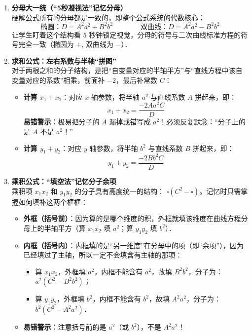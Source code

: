 \documentclass[11pt,a4paper]{ctexart}
\begin{document}
\begin{enumerate}[label=\arabic*.]
  \item \textbf{分母大一统（“5秒凝视法”记忆分母）} \\
        硬解公式所有的分母都是一致的，即整个公式系统的代数核心：
        \[ \text{椭圆}：D = A^2a^2 + B^2b^2 \qquad\qquad \text{双曲线}：D = A^2a^2 - B^2b^2 \]
        让学生盯着这个结构看 $5$ 秒钟锁定视觉，分母的符号与二次曲线标准方程的符号完全一致（椭圆为 $+$, 双曲线为 $-$）．
        
  \item \textbf{求和公式：左右系数与半轴“拼图”} \\
        对于两根之和的分子结构，是把“自变量对应的半轴平方”与“直线方程中该自变量对应的系数”相乘，前面补 $-2$，最后补常数 $C$：
        \begin{itemize}
          \item \textbf{计算 $x_1+x_2$}：对应 $x$ 轴参数，将半轴 $a^2$ 与直线系数 $A$ 拼起来，即：
                \[ x_1 + x_2 = \frac{-2Aa^2C}{D} \]
                \textbf{易错警示}：极易把分子的 $A$ 漏掉或错写成 $a^2$！必须反复默念：“分子上的是 $A$ 不是 $a^2$！”
          \item \textbf{计算 $y_1+y_2$}：对应 $y$ 轴参数，将半轴 $b^2$ 与直线系数 $B$ 拼起来，即：
                \[ y_1 + y_2 = \frac{-2Bb^2C}{D} \]
        \end{itemize}

  \item \textbf{乘积公式：“填空法”记忆分子余项} \\
        乘积项 $x_1x_2$ 和 $y_1y_2$ 的分子具有高度统一的结构： $\square(C^2 - \square)$。记忆时只需掌握如何填补这两个框框：
        \begin{itemize}
          \item \textbf{外框（括号前）}：因为算的是哪个维度的积，外框就填该维度在曲线方程分母上的半轴平方（算 $x_1x_2$ 填 $a^2$；算 $y_1y_2$ 填 $b^2$）．
          \item \textbf{内框（括号内）}：内框填的是“另一维度”在分母中的项（即“余项”），因为已经填过了主轴，所以一定不会填含有主轴的那项：
                \begin{itemize}
                  \item 算 $x_1x_2$，外框填 $a^2$，内框不能含有 $a^2$，故填 $B^2b^2$，分子为：$a^2(C^2 - B^2b^2)$；
                  \item 算 $y_1y_2$，外框填 $b^2$，内框不能含有 $b^2$，故填 $A^2a^2$，分子为：$b^2(C^2 - A^2a^2)$．
                \end{itemize}
          \item \textbf{易错警示}：注意括号前的是 $a^2$（或 $b^2$），不是 $A^2a^2$！
        \end{itemize}


\end{enumerate}
\end{document}

